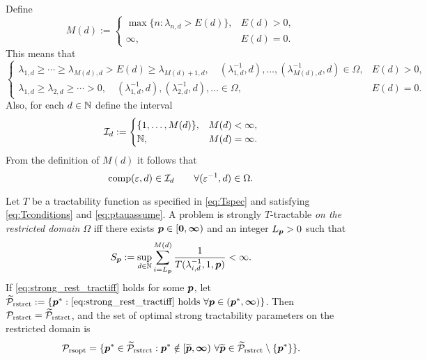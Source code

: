 \documentclass[11pt,a4paper]{article}
\renewcommand{\hI}{\ci}
\begin{document}
Define 
\begin{equation} \label{eq:Mddef}
    M(d) := \begin{cases}
        \max\{n : \lambda_{n,d} > E(d)\}, & E(d) > 0, \\
        \infty, & E(d) = 0.
    \end{cases}
\end{equation}
This means that 
\[
\begin{cases}
\lambda_{1,d}\ge  \cdots \ge \lambda_{M(d),d} > E(d) \ge\lambda_{M(d)+1,d}, \quad
(\lambda_{1,d}^{-1},d), \ldots, (\lambda^{-1}_{M(d),d},d)  \in \Omega, & E(d) > 0, \\
\lambda_{1,d}\ge \lambda_{2,d}\ge \cdots  > 0, \quad
(\lambda_{1,d}^{-1},d), (\lambda_{2,d}^{-1},d), \ldots \in \Omega, & E(d) = 0.
\end{cases}
\]
Also, for each $d \in \mathbb{N}$ define the interval 
\begin{equation} \label{eq:hIdef}
\hI_{d}:=\begin{cases} 
\{1,\ldots, M(d)\}, & M(d) < \infty, \\
\naturals, & M(d) = \infty.
\end{cases}
\end{equation}
From the definition of $M(d)$ it follows that 
\[
\comp(\varepsilon,d) \in \hI_d \qquad \forall (\varepsilon^{-1},d) \in \Omega.
\]

\begin{theorem}\label{thm_main_rest_strong_tract}
Let $T$ be a tractability function as specified in \eqref{eq:Tspec} and satisfying \eqref{eq:Tconditions} and \eqref{eq:ptauassume}.  A problem is strongly $T$-tractable \emph{on the restricted domain $\Omega$} iff there exists $\boldsymbol{p} \in [\boldsymbol{0}, \boldsymbol{\infty})$ and an integer $L_{\boldsymbol{p}} > 0$ such that
\begin{equation} \label{eq:strong_rest_tractiff}
     S_{\boldsymbol{p}}:=\sup_{d \in \mathbb{N}} \sum_{i = L_{\boldsymbol{p}}}^{M(d)} \frac{1}{T(\lambda_{i,d}^{-1},1,\boldsymbol{p})} < \infty.
\end{equation}
If \eqref{eq:strong_rest_tractiff} holds for some $\boldsymbol{p}$, let  $\widetilde{\mathcal{P}}_{\textup{rstrct}} : = \{\boldsymbol{p}^* : \eqref{eq:strong_rest_tractiff} \text{ holds }\forall \boldsymbol{p} \in (\boldsymbol{p}^*,\boldsymbol{\infty})\}$.  Then $\mathcal{P}_{\textup{rstrct}} = \widetilde{\mathcal{P}}_{\textup{rstrct}}$, and the set of optimal strong tractability parameters on the restricted domain is
\[
	\mathcal{P}_{\textup{rsopt}} =
	\{\boldsymbol{p}^* \in \widetilde{\mathcal{P}}_{\textup{rstrct}} :  \boldsymbol{p}^* \notin [\widetilde{\boldsymbol{p}},\boldsymbol{\infty}) \ \forall \widetilde{\boldsymbol{p}}\in  \widetilde{\mathcal{P}}_{\textup{rstrct}} \setminus \{\boldsymbol{p}^*\} \}.
\]
\end{theorem}
\end{document}

